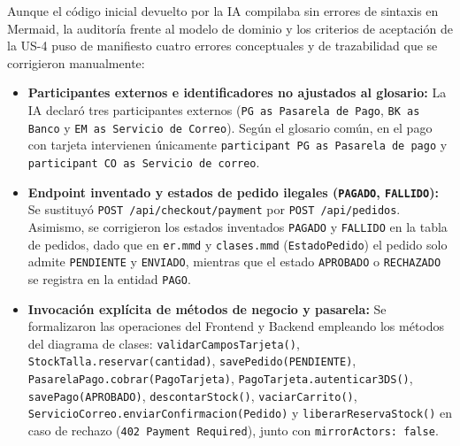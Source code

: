 Aunque el código inicial devuelto por la IA compilaba sin errores de sintaxis en Mermaid, la auditoría frente al modelo de dominio y los criterios de aceptación de la US-4 puso de manifiesto cuatro errores conceptuales y de trazabilidad que se corrigieron manualmente:
\begin{itemize}[leftmargin=*,nosep]
\item \textbf{Participantes externos e identificadores no ajustados al glosario:} La IA declaró tres participantes externos (\texttt{PG as Pasarela de Pago}, \texttt{BK as Banco} y \texttt{EM as Servicio de Correo}). Según el glosario común, en el pago con tarjeta intervienen únicamente \texttt{participant PG as Pasarela de pago} y \texttt{participant CO as Servicio de correo}.
\item \textbf{Endpoint inventado y estados de pedido ilegales (\texttt{PAGADO}, \texttt{FALLIDO}):} Se sustituyó \texttt{POST /api/checkout/payment} por \texttt{POST /api/pedidos}. Asimismo, se corrigieron los estados inventados \texttt{PAGADO} y \texttt{FALLIDO} en la tabla de pedidos, dado que en \texttt{er.mmd} y \texttt{clases.mmd} (\texttt{EstadoPedido}) el pedido solo admite \texttt{PENDIENTE} y \texttt{ENVIADO}, mientras que el estado \texttt{APROBADO} o \texttt{RECHAZADO} se registra en la entidad \texttt{PAGO}.
\item \textbf{Invocación explícita de métodos de negocio y pasarela:} Se formalizaron las operaciones del Frontend y Backend empleando los métodos del diagrama de clases: \texttt{validarCamposTarjeta()}, \texttt{StockTalla.reservar(cantidad)}, \texttt{savePedido(PENDIENTE)}, \texttt{PasarelaPago.cobrar(PagoTarjeta)}, \texttt{PagoTarjeta.autenticar3DS()}, \texttt{savePago(APROBADO)}, \texttt{descontarStock()}, \texttt{vaciarCarrito()}, \texttt{ServicioCorreo.enviarConfirmacion(Pedido)} y \texttt{liberarReservaStock()} en caso de rechazo (\texttt{402 Payment Required}), junto con \texttt{mirrorActors: false}.
\end{itemize}
